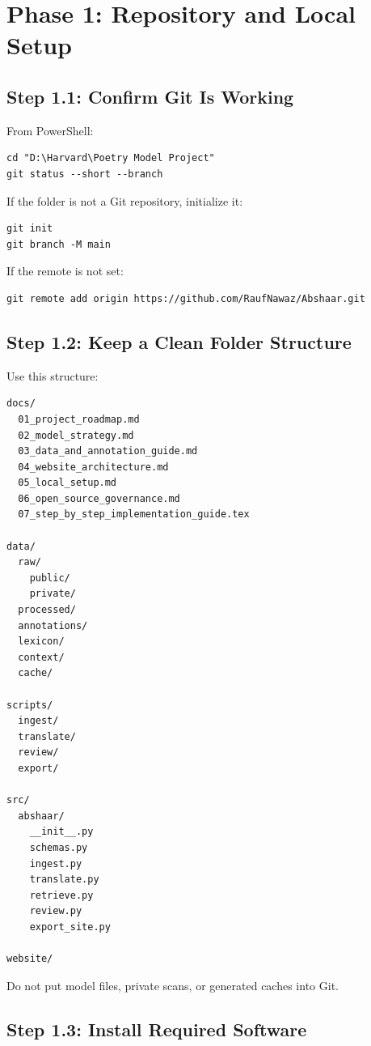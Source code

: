 \documentclass[11pt]{article}
\begin{document}
\section{Phase 1: Repository and Local Setup}

\subsection{Step 1.1: Confirm Git Is Working}

From PowerShell:

\begin{verbatim}
cd "D:\Harvard\Poetry Model Project"
git status --short --branch
\end{verbatim}

If the folder is not a Git repository, initialize it:

\begin{verbatim}
git init
git branch -M main
\end{verbatim}

If the remote is not set:

\begin{verbatim}
git remote add origin https://github.com/RaufNawaz/Abshaar.git
\end{verbatim}

\subsection{Step 1.2: Keep a Clean Folder Structure}

Use this structure:

\begin{verbatim}
docs/
  01_project_roadmap.md
  02_model_strategy.md
  03_data_and_annotation_guide.md
  04_website_architecture.md
  05_local_setup.md
  06_open_source_governance.md
  07_step_by_step_implementation_guide.tex

data/
  raw/
    public/
    private/
  processed/
  annotations/
  lexicon/
  context/
  cache/

scripts/
  ingest/
  translate/
  review/
  export/

src/
  abshaar/
    __init__.py
    schemas.py
    ingest.py
    translate.py
    retrieve.py
    review.py
    export_site.py

website/
\end{verbatim}

Do not put model files, private scans, or generated caches into Git.

\subsection{Step 1.3: Install Required Software}
\end{document}
